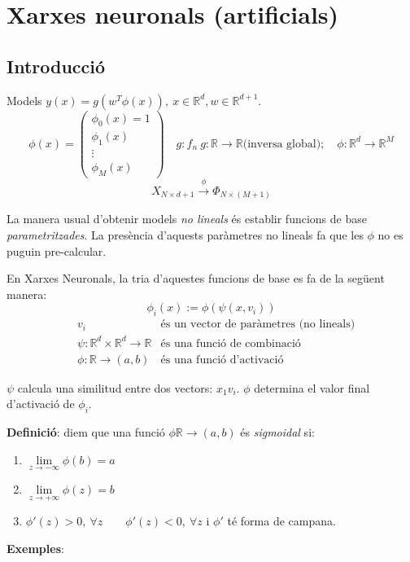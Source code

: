 \chapter{Xarxes neuronals (artificials)}
\section{Introducció}
Models $y(x) = g(w^T \phi (x)),\ x \in \mathbb{R}^d, w \in \mathbb{R}^{d + 1}$.
$$
\phi(x) = 
\begin{pmatrix}
\phi_0(x) = 1 \\
\phi_1(x)\\
\vdots\\
\phi_M(x)
\end{pmatrix}
\quad 
g : f_n \ g:\mathbb{R} \rightarrow \mathbb{R} \text{(inversa global)}; 
\quad \phi : \mathbb{R}^d \rightarrow \mathbb{R}^M
$$
$$
X_{N \times d+ 1} \xrightarrow{\phi} \Phi_{N \times (M + 1)}
$$

La manera usual d'obtenir models \emph{no lineals} és establir funcions de base \emph{parametritzades}. La presència d'aquests paràmetres no lineals fa que les $\phi$ no es puguin pre-calcular.

En Xarxes Neuronals, la tria d'aquestes funcions de base es fa de la següent manera:
$$
\phi_i(x) := \phi (\psi(x, v_i))
$$
\begin{align*}
	&v_i & \text{és un vector de paràmetres (no lineals)} \\
	&\psi : \mathbb{R}^d \times \mathbb{R}^d \rightarrow \mathbb{R}
	& \text{és una funció de combinació} \\
	&\phi : \mathbb{R} \rightarrow (a,b) &
	\text{és una funció d'activació}
\end{align*}

$\psi$ calcula una similitud entre dos vectors: $x_1 v_i$.
$\phi$ determina el valor final d'activació de $\phi_i$.

\textbf{Definició}: diem que una funció $\phi \mathbb{R} \rightarrow (a,b)$ és \emph{sigmoidal} si:
\begin{enumerate}
	\item $\lim\limits_{z \rightarrow - \infty} \phi(b) = a$
	\item $\lim\limits_{z \rightarrow + \infty} \phi(z) = b$
	\item $\phi'(z) > 0,\ \forall z \qquad \phi'(z) < 0,\ \forall z$ i $\phi'$ té forma de campana.
\end{enumerate}

\textbf{Exemples}:

